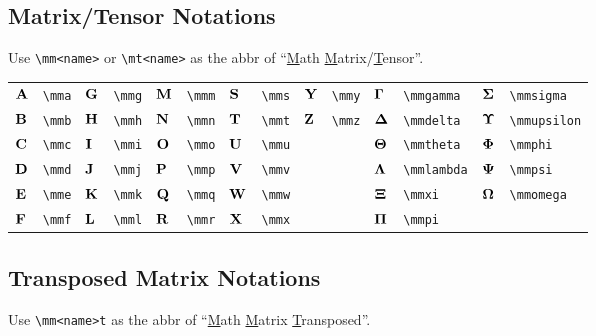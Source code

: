 \documentclass{article}
\begin{document}
\subsection{Matrix/Tensor Notations}
Use \lstinline`\mm<name>` or \lstinline`\mt<name>` as the abbr of ``\underline{M}ath \underline{M}atrix/\underline{T}ensor''.

\begin{tabular}{*{14}{l}}
${\mathbf A}$ & \lstinline`\mma` & ${\mathbf G}$ & \lstinline`\mmg` & ${\mathbf M}$ & \lstinline`\mmm` & ${\mathbf S}$ & \lstinline`\mms` & ${\mathbf Y}$ & \lstinline`\mmy` & ${\bm \Gamma}$ & \lstinline`\mmgamma` & ${\bm \Sigma}$ & \lstinline`\mmsigma`\\
${\mathbf B}$ & \lstinline`\mmb` & ${\mathbf H}$ & \lstinline`\mmh` & ${\mathbf N}$ & \lstinline`\mmn` & ${\mathbf T}$ & \lstinline`\mmt` & ${\mathbf Z}$ & \lstinline`\mmz` & ${\bm \Delta}$ & \lstinline`\mmdelta` & ${\bm \Upsilon}$ & \lstinline`\mmupsilon`\\
${\mathbf C}$ & \lstinline`\mmc` & ${\mathbf I}$ & \lstinline`\mmi` & ${\mathbf O}$ & \lstinline`\mmo` & ${\mathbf U}$ & \lstinline`\mmu` &  &  & ${\bm \Theta}$ & \lstinline`\mmtheta` & ${\bm \Phi}$ & \lstinline`\mmphi`\\
${\mathbf D}$ & \lstinline`\mmd` & ${\mathbf J}$ & \lstinline`\mmj` & ${\mathbf P}$ & \lstinline`\mmp` & ${\mathbf V}$ & \lstinline`\mmv` &  &  & ${\bm \Lambda}$ & \lstinline`\mmlambda` & ${\bm \Psi}$ & \lstinline`\mmpsi`\\
${\mathbf E}$ & \lstinline`\mme` & ${\mathbf K}$ & \lstinline`\mmk` & ${\mathbf Q}$ & \lstinline`\mmq` & ${\mathbf W}$ & \lstinline`\mmw` &  &  & ${\bm \Xi}$ & \lstinline`\mmxi` & ${\bm \Omega}$ & \lstinline`\mmomega`\\
${\mathbf F}$ & \lstinline`\mmf` & ${\mathbf L}$ & \lstinline`\mml` & ${\mathbf R}$ & \lstinline`\mmr` & ${\mathbf X}$ & \lstinline`\mmx` &  &  & ${\bm \Pi}$ & \lstinline`\mmpi` & \\
\end{tabular}


\subsection{Transposed Matrix Notations}
Use \lstinline`\mm<name>t` as the abbr of ``\underline{M}ath \underline{M}atrix \underline{T}ransposed''.
\end{document}
